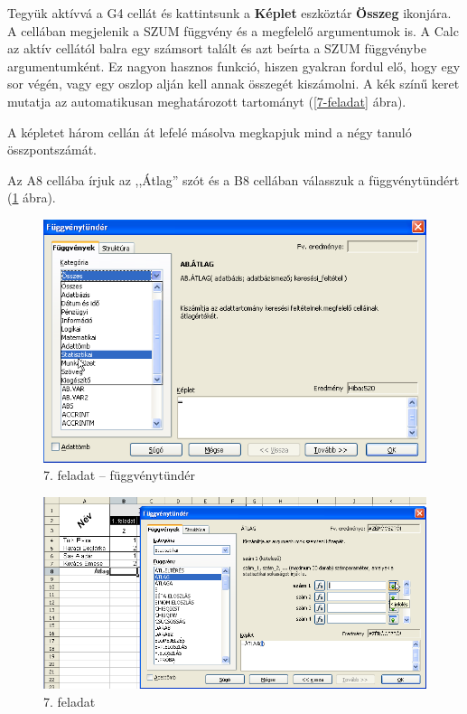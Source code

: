 Tegyük aktívvá a G4 cellát és kattintsunk a \textbf{Képlet}
eszköztár \textbf{Összeg} ikonjára. A cellában megjelenik a
SZUM függvény és a megfelelő argumentumok is. A Calc az
aktív cellától balra egy számsort talált és azt beírta a
SZUM függvénybe argumentumként. Ez nagyon hasznos funkció,
hiszen gyakran fordul elő, hogy egy sor végén, vagy egy oszlop
alján kell annak összegét kiszámolni. A kék színű keret
 mutatja az automatikusan meghatározott tartományt (\ref{7-feladat} ábra).

A képletet három cellán át lefelé másolva megkapjuk mind a
négy tanuló összpontszámát.

Az A8 cellába írjuk az ,,Átlag''
szót és a B8 cellában válasszuk a függvénytündért 
(\ref{7-feladatFüggvény} ábra).

\begin{figure}[!h]
\begin{center}
\includegraphics[width=13.999cm]{oocalcv2-img37.png}
\caption{7. feladat --  függvénytündér}\label{7-feladatFüggvény}
\end{center}
\end{figure}

\begin{figure}[!h]
\begin{center}
\includegraphics[width=15.999cm]{oocalcv2-img38.png}
\caption{7. feladat }\label{7-feladatArgumentum}
\end{center}
\end{figure}

